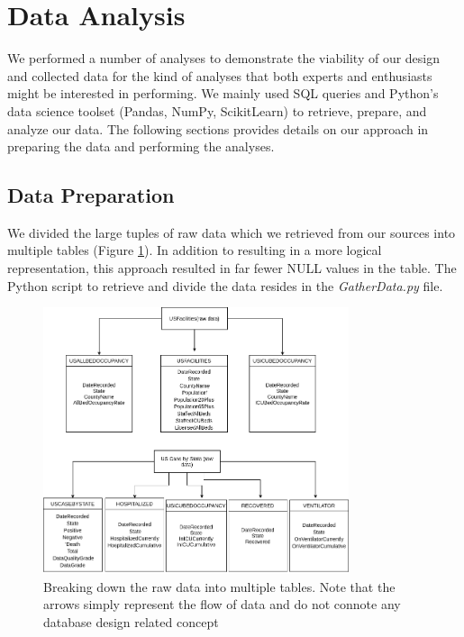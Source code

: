 \documentclass[11pt]{article}
\begin{document}
\pagebreak

\section{Data Analysis}
\label{sec:analysis}

\noindent
We performed a number of analyses to demonstrate the viability of our design and collected data for the kind of analyses that both experts and enthusiasts might be interested in performing. We mainly used SQL queries and Python's data science toolset (Pandas\cite{citepandas}, NumPy\cite{citenumpy}, ScikitLearn\cite{cite_scikit-learn}) to retrieve, prepare, and analyze our data. The following sections provides details on our approach in preparing the data and performing the analyses.

\subsection{Data Preparation}

\noindent
We divided the large tuples of raw data which we retrieved from our sources into multiple tables (Figure \ref{fig:tbl_bd}). In addition to resulting in a more logical representation, this approach resulted in far fewer NULL values in the table. The Python script to retrieve and divide the data resides in the \textit{GatherData.py} file.

\FloatBarrier
\begin{figure}[h]
    \centering
    \includegraphics[width=0.8\textwidth]{diagrams/data_breakdown.png}
    \caption{Breaking down the raw data into multiple tables. Note that the arrows simply represent the flow of data and do not connote any database design related concept}
    \label{fig:tbl_bd}
\end{figure}
\FloatBarrier
\end{document}
